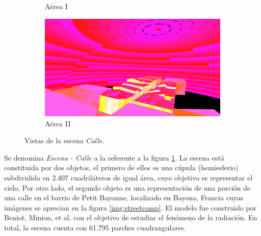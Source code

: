 \begin{figure}[htbp]
\begin{subfigure}{0.45\textwidth}
		\caption{Aérea I}
	\end{subfigure}
	\begin{subfigure}{0.45\textwidth}
		\includegraphics[width=1\linewidth]{assets/street4}
		\caption{Aérea II}
	\end{subfigure}
	\caption{Vistas de la escena \textit{Calle}.}
	\label{img:street}
\end{figure}

Se denomina \textit{Escena - Calle} a la referente a la figura \ref{img:street}. La escena está constituida por dos objetos, el primero de ellos es una cúpula (hemiesferio) subdividida en 2.407 cuadriláteros de igual área, cuyo objetivo es representar el cielo. Por otro lado, el segundo objeto es una representación de una porción de una calle en el barrio de Petit Bayonne, localizado en Bayona, Francia cuyas imágenes se aprecian en la figura \ref{img:streetcomp}. El modelo fue construido por Beniot, Minion, et al. \cite{Benoit} con el objetivo de estudiar el fenómeno de la radiación. En total, la escena cuenta con 61.795 parches cuadrangulares.


